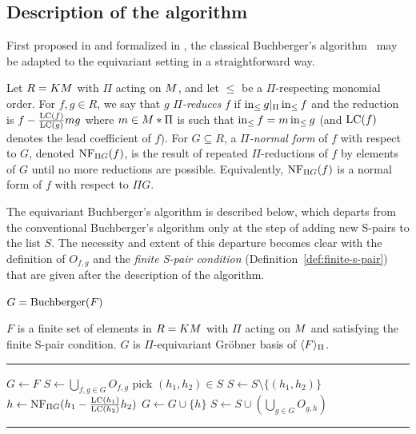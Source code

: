 \subsection{Description of the algorithm}
First proposed in \cite{aschenbrenner2007finite} and formalized in \cite{Brouwer09e}, the classical Buchberger's algorithm~\cite{buchberger1965algorithmus} may be adapted to the equivariant setting in a straightforward way.

Let $R = KM$ with $\Pi$ acting on $M$, and let $\leq$ be a $\Pi$-respecting monomial order.  For $f,g \in R$, we say that $g$ {\em $\Pi$-reduces} $f$ if $\operatorname{in}_{\leq} g |_{\Pi} \operatorname{in}_{\leq} f$ and the reduction is $f - \frac{\operatorname{LC}(f)}{\operatorname{LC}(g)}mg$ where $m \in M *\Pi$ is such that $\operatorname{in}_{\leq} f = m\operatorname{in}_{\leq} g$ (and $\operatorname{LC}(f)$ denotes the lead coefficient of $f$).  For $G \subseteq R$, a {\em $\Pi$-normal form} of $f$ with respect to $G$, denoted $\operatorname{NF}_{\Pi G}(f)$, is the result of repeated $\Pi$-reductions of $f$ by elements of $G$ until no more reductions are possible.  Equivalently, $\operatorname{NF}_{\Pi G}(f)$ is a normal form of $f$ with respect to $\Pi G$.

The equivariant Buchberger's algorithm is described below, which departs from the conventional Buchberger's algorithm only at the step of adding new S-pairs to the list $S$.  The necessity and extent of this departure becomes clear with the definition of $O_{f,g}$ and the {\em finite S-pair condition} (Definition~\ref{def:finite-s-pair}) that are given after the description of the algorithm.

\begin{algorithm}\label{alg:Buchberger}
$G = \operatorname{Buchberger}(F)$
\begin{algorithmic}[1]
\REQUIRE $F$ is a finite set of elements in $R = KM$ with $\Pi$ acting on $M$ and satisfying the finite S-pair condition.
\ENSURE $G$ is $\Pi$-equivariant Gr\"obner basis of $\langle F \rangle_{\Pi}$.

\smallskip \hrule \smallskip

\STATE $G\gets F$
\STATE $S\gets \bigcup_{f,g\in G} O_{f,g}$
	\STATE pick $(h_1,h_2) \in S$
	\STATE $S\gets S\setminus\{(h_1,h_2)\}$ 
	\STATE $h \gets \operatorname{NF}_{\Pi G}(h_1 - \frac{\operatorname{LC}(h_1)}{\operatorname{LC}(h_2)}h_2)$
		\STATE $G\gets G\cup \{h\}$
		\STATE $S\gets S\cup \left(\bigcup_{g\in G}O_{g,h}\right)$
	\ENDIF
\ENDWHILE
\smallskip \hrule \smallskip
\end{algorithmic}
\end{algorithm}

